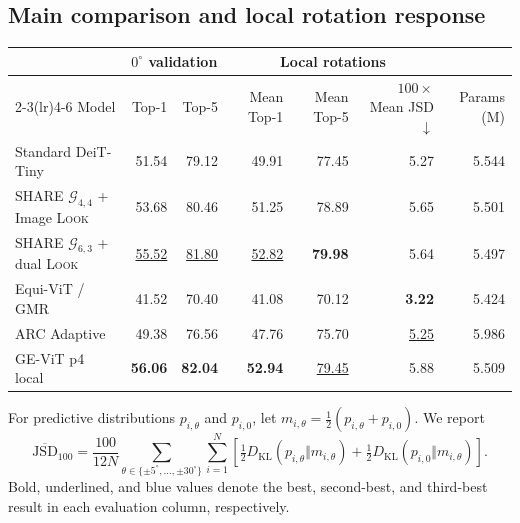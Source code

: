 \documentclass[10pt]{article}
\newcommand{\look}{\textsc{Look}}
\newcommand{\geom}[2]{\ensuremath{\mathcal{G}_{#1,#2}}}
\newcommand{\third}[1]{\textcolor{thirdblue}{#1}}
\begin{document}
\subsection{Main comparison and local rotation response}
\begin{center}
\centering
{}
\label{tab:main}
\small
\setlength{\tabcolsep}{6.0pt}
\begin{tabular}{lrrrrrr}
\toprule
& \multicolumn{2}{c}{$0^\circ$ validation} &
  \multicolumn{3}{c}{Local rotations} & \\
\cmidrule(lr){2-3}\cmidrule(lr){4-6}
Model & Top-1 & Top-5 & Mean Top-1 & Mean Top-5 & $100\!\times$ Mean JSD $\downarrow$ & Params (M)\\
\midrule
Standard DeiT-Tiny              & 51.54 & 79.12 & 49.91 & 77.45 & \third{5.27} & 5.544\\
SHARE \geom{4}{4} + Image \look{}  & \third{53.68} & \third{80.46} & \third{51.25} & \third{78.89} & 5.65 & 5.501\\
SHARE \geom{6}{3} + dual \look{}   & \underline{55.52} & \underline{81.80} & \underline{52.82} & \textbf{79.98} & 5.64 & 5.497\\
Equi-ViT / GMR                  & 41.52 & 70.40 & 41.08 & 70.12 & \textbf{3.22} & 5.424\\
ARC Adaptive                    & 49.38 & 76.56 & 47.76 & 75.70 & \underline{5.25} & 5.986\\
GE-ViT p4 local                 & \textbf{56.06} & \textbf{82.04} & \textbf{52.94} & \underline{79.45} & 5.88 & 5.509\\
\bottomrule
\end{tabular}
\end{center}

For predictive distributions $p_{i,\theta}$ and $p_{i,0}$, let
$m_{i,\theta}=\tfrac12(p_{i,\theta}+p_{i,0})$. We report
\begin{equation}
\overline{\mathrm{JSD}}_{100}
=\frac{100}{12N}\sum_{\theta\in\{\pm5^\circ,\ldots,\pm30^\circ\}}
\sum_{i=1}^{N}\left[
\tfrac12 D_{\mathrm{KL}}(p_{i,\theta}\Vert m_{i,\theta})+
\tfrac12 D_{\mathrm{KL}}(p_{i,0}\Vert m_{i,\theta})\right].
\label{eq:rotation-jsd}
\end{equation}
Bold, underlined, and blue values denote the best, second-best, and third-best
result in each evaluation column, respectively.
\end{document}
